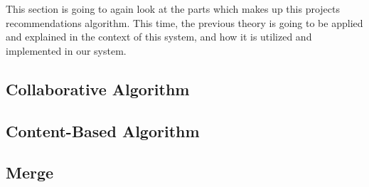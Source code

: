 This section is going to again look at the parts which makes up this projects recommendations algorithm. This time, the previous theory is going to be applied and explained in the context of this system, and how it is utilized and implemented in our system.

\subsection{Collaborative Algorithm}
\label{CollaborativeAlg}

\subsection{Content-Based Algorithm}
\label{ContentBasedAlg}

\subsection{Merge}
\label{Merge}
